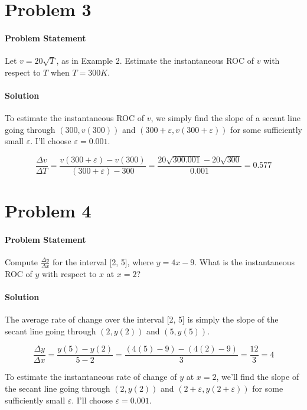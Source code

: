 \documentclass{article}
\begin{document}
  \section{Problem 3}
  \paragraph{Problem Statement} Let \(v=20\sqrt{T}\), as in Example 2. Estimate the instantaneous ROC of \(v\) with respect to \(T\) when \(T=300 K\).

  \paragraph{Solution}
  To estimate the instantaneous ROC of \(v\), we simply find the slope of a secant line going through \((300, v(300)) \) and \( (300 + \varepsilon, v(300 + \varepsilon)) \) for some sufficiently small \(\varepsilon\). I'll choose \(\varepsilon = 0.001\).

  \begin{equation}
    \frac{\Delta{v}}{\Delta{T}} = \frac{v(300+\varepsilon) - v(300)}{(300 + \varepsilon) - 300} = \frac{20\sqrt{300.001} - 20\sqrt{300}}{0.001} = \boxed{0.577}
  \end{equation}

  \section{Problem 4}
  \paragraph{Problem Statement} Compute \(\frac{\Delta{y}}{\Delta{x}}\) for the interval [2, 5], where \(y=4x - 9\). What is the instantaneous ROC of \(y\) with respect to \(x\) at \(x=2\)?

  \paragraph{Solution} The average rate of change over the interval [2, 5] is simply the slope of the secant line going through \((2, y(2)) \) and \( (5, y(5)) \).

  \begin{equation}
    \frac{\Delta{y}}{\Delta{x}} = \frac{y(5) - y(2)}{5 - 2} = \frac{(4(5) - 9) - (4(2) - 9)}{3} = \frac{12}{3} = \boxed{4}
  \end{equation}

  To estimate the instantaneous rate of change of \(y\) at \(x=2\), we'll find the slope of the secant line going through \((2, y(2)) \) and \( (2 + \varepsilon, y(2 + \varepsilon)) \) for some sufficiently small \(\varepsilon\). I'll choose \(\varepsilon = 0.001\).
\end{document}
